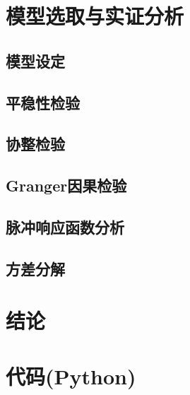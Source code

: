 \documentclass[nobib]{tufte-handout}
\begin{document}
    \section{模型选取与实证分析}
    \subsection{模型设定}

    \subsection{平稳性检验}

    \subsection{协整检验}

    \subsection{Granger因果检验}

    \subsection{脉冲响应函数分析}

    \subsection{方差分解}

    \section{结论}

    
    
    \appendix
    \section{代码(Python)}
    
\end{document}

